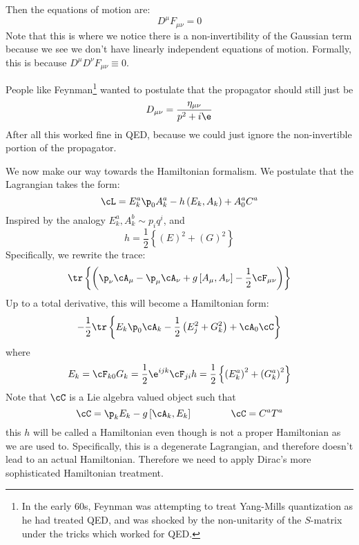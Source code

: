 \documentclass{booc}
\begin{document}
Then the equations of motion are:
\begin{equation}
D^\mu F_{\mu\nu} = 0
\end{equation}
Note that this is where we notice there is a non-invertibility of the 
Gaussian term because we see we don't have linearly independent equations of motion.
Formally, this is because $D^\mu D^\nu F_{\mu\nu}\equiv 0$.

People like Feynman\footnote{In the early 60s, Feynman was attempting to treat Yang-Mills
quantization as he had treated QED, and was shocked by the non-unitarity of the $S$-matrix
under the tricks which worked for QED.}
wanted to postulate that the propagator should still just be
\begin{equation}
D_{\mu\nu} = \frac{\eta_{\mu\nu}}{p^2 + i\e}
\end{equation}
After all this worked fine in QED, because we could just ignore the non-invertible portion
of the propagator.

We now make our way towards the Hamiltonian formalism.
We postulate that the Lagrangian takes the form:
\begin{equation}
\cL = E_k^a \p_0 A_k^a - h\left( E_k , A_k \right) + A_0^a C^a
\end{equation}
Inspired by the analogy $E_k^a, A_k^b \sim p_i q^i$, and
\begin{equation}
h = \frac{1}{2} \left\{ 
\left( E \right)^2 + 
\left( G \right)^2
\right\}
\end{equation}
Specifically, we rewrite the trace:
\begin{equation}
\tr\left\{ \left( \p_\nu \cA_\mu - \p_\mu \cA_\nu 
+ g\left[ A_\mu , A_\nu \right] - \frac{1}{2} \cF_{\mu\nu}\right)
\right\}
\end{equation}
Up to a total derivative, this will become a Hamiltonian form:
\begin{equation}
-\frac{1}{2}\tr\left\{ 
E_k \p_0 \cA_k - \frac{1}{2}\left( 
E_j^2 + G_k^2
\right) + \cA_0 \cC
\right\}
\end{equation}
where
\begin{equation}
E_k = \cF_{k0}
G_k = \frac{1}{2} \e^{ijk}\cF_{ji}
h = \frac{1}{2} \left\{ \left( E_k^a \right)^2 + 
\left( G_k^a \right)^2\right\}
\end{equation}
Note that $\cC$ is a Lie algebra valued object such that
\begin{equation}
\cC = \p_k E_k - g\left[ \cA_k , E_k \right]
\qquad\qquad
\cC = C^a T^a
\end{equation}
this $h$ will be called a Hamiltonian
even though is not a proper Hamiltonian as we are used to.
Specifically, this is a degenerate Lagrangian, 
and therefore doesn't lead to an actual Hamiltonian.
Therefore we need to apply Dirac's 
more sophisticated Hamiltonian treatment. 
\end{document}
